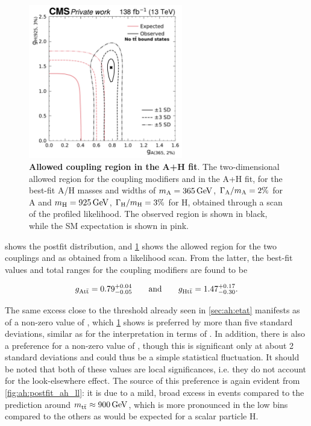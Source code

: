 \begin{figure}[!th]
    \centering
    \includegraphics[width=0.6\textwidth]{figures/ah/contour/A_m365_w2p0__H_m925_w3p0_nll_g1__g2_ll_noetat.pdf}
    \caption{
        \textbf{Allowed coupling region in the A+H fit}. The two-dimensional allowed region for the coupling modifiers \gAtt and \gHtt in the A+H fit, for the best-fit A/H masses and widths of $\mA = \SI{365}{\GeV}$, $\Gamma_{\mathrm{A}}/m_{\mathrm{A}} = 2\%$ for A and $\mH = \SI{925}{\GeV}$, $\Gamma_{\mathrm{H}}/m_{\mathrm{H}} = 3\%$ for H, obtained through a scan of the profiled likelihood. The observed region is shown in black, while the SM expectation is shown in pink.
    }
    \label{fig:ah:contour_ah_ll}
\end{figure}

 shows the postfit \mttchelchan distribution, and \cref{fig:ah:contour_ah_ll} shows the allowed region for the two couplings \gAtt and \gHtt as obtained from a likelihood scan. From the latter, the best-fit values and total ranges for the coupling modifiers are found to be

\begin{equation}
\label{eq:ah:ahbestfit}
    g_{\mathrm{A t \bar{t}}} = 0.79^{+0.04}_{-0.05} \quad\quad \text{and} \quad\quad g_{\mathrm{H t \bar{t}}} = 1.47^{+0.17}_{-0.30}.
\end{equation}

The same excess close to the \ttbar threshold already seen in \cref{sec:ah:etat} manifests as of a non-zero value of \gAtt, which \cref{fig:ah:contour_ah_ll} shows is preferred by more than five standard deviations, similar as for the interpretation in terms of \etat. In addition, there is also a preference for a non-zero value of \gHtt, though this is significant only at about 2 standard deviations and could thus be a simple statistical fluctuation. It should be noted that both of these values are local significances, i.e. they do not account for the look-elsewhere effect. The source of this preference is again evident from \cref{fig:ah:postfit_ah_ll}: it is due to a mild, broad excess in events compared to the prediction around $\mtt \approx \SI{900}{\GeV}$, which is more pronounced in the low \chan bins compared to the others as would be expected for a scalar particle H.

